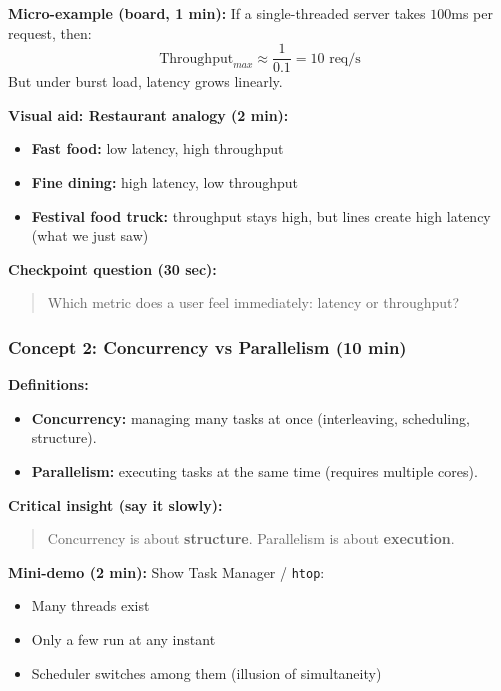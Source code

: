 \documentclass[11pt,a4paper]{article}
\begin{document}
\textbf{Micro-example (board, 1 min):}
If a single-threaded server takes $100$ms per request, then:
\[
\text{Throughput}_{max} \approx \frac{1}{0.1} = 10 \text{ req/s}
\]
But under burst load, latency grows linearly.

\textbf{Visual aid: Restaurant analogy (2 min):}
\begin{itemize}[leftmargin=*]
	\item \textbf{Fast food:} low latency, high throughput
	\item \textbf{Fine dining:} high latency, low throughput
	\item \textbf{Festival food truck:} throughput stays high, but lines create high latency (what we just saw)
\end{itemize}

\textbf{Checkpoint question (30 sec):}
\begin{quote}
	Which metric does a user feel immediately: latency or throughput?
\end{quote}

\subsubsection*{Concept 2: Concurrency vs Parallelism (10 min)}

\textbf{Definitions:}
\begin{itemize}[leftmargin=*]
	\item \textbf{Concurrency:} managing many tasks at once (interleaving, scheduling, structure).
	\item \textbf{Parallelism:} executing tasks at the same time (requires multiple cores).
\end{itemize}

\textbf{Critical insight (say it slowly):}
\begin{quote}
	Concurrency is about \textbf{structure}. Parallelism is about \textbf{execution}.
\end{quote}

\textbf{Mini-demo (2 min):}
Show Task Manager / \texttt{htop}:
\begin{itemize}[leftmargin=*]
	\item Many threads exist
	\item Only a few run at any instant
	\item Scheduler switches among them (illusion of simultaneity)
\end{itemize}
\end{document}
